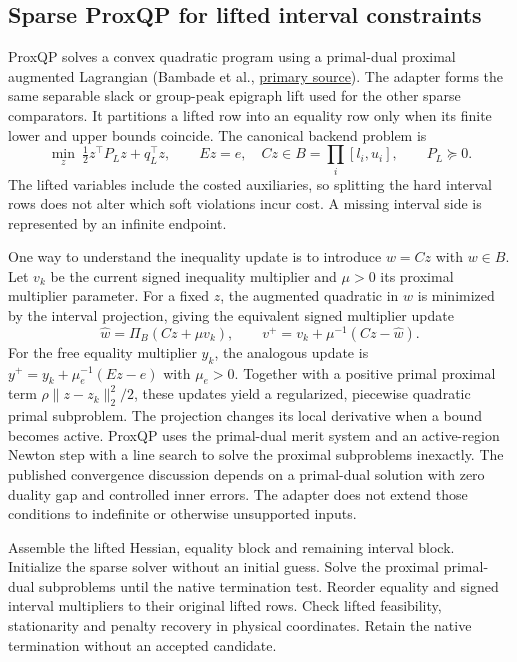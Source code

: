 \subsection{Sparse ProxQP for lifted interval constraints}\label{sec:method-proxqp}
ProxQP solves a convex quadratic program using a primal-dual proximal
augmented Lagrangian (Bambade et al., \href{https://simple-robotics.github.io/publications/proxqp/}{primary source}).
The adapter forms the same separable slack or group-peak epigraph lift
used for the other sparse comparators. It partitions a lifted row into
an equality row only when its finite lower and upper bounds coincide.
The canonical backend problem is
\begin{equation}\label{eq:proxqp-interval-form}
 \min_z \ \tfrac12z^\top P_Lz+q_L^\top z,\qquad
 Ez=e,\quad Cz\in B=\prod_i[l_i,u_i],
 \qquad P_L\succeq0.
\end{equation}
The lifted variables include the costed auxiliaries, so splitting the
hard interval rows does not alter which soft violations incur cost.
A missing interval side is represented by an infinite endpoint.

One way to understand the inequality update is to introduce \(w=Cz\)
with \(w\in B\). Let \(v_k\) be the current signed inequality multiplier
and \(\mu>0\) its proximal multiplier parameter. For a fixed \(z\), the
augmented quadratic in \(w\) is minimized by the interval projection,
giving the equivalent signed multiplier update
\begin{equation}\label{eq:proxqp-dual-update}
 \widehat w=\Pi_B(Cz+\mu v_k),\qquad
 v^+=v_k+\mu^{-1}(Cz-\widehat w).
\end{equation}
For the free equality multiplier \(y_k\), the analogous update is
\(y^+=y_k+\mu_e^{-1}(Ez-e)\) with \(\mu_e>0\).
Together with a positive primal proximal term
\(\rho\lVert z-z_k\rVert_2^2/2\), these updates yield a regularized,
piecewise quadratic primal subproblem. The projection changes its
local derivative when a bound becomes active. ProxQP uses the
primal-dual merit system and an active-region Newton step with a line
search to solve the proximal subproblems inexactly. The published
convergence discussion depends on a primal-dual solution with zero
duality gap and controlled inner errors. The adapter does not extend
those conditions to indefinite or otherwise unsupported inputs.

\begin{algorithm}[ht]
\caption{Sparse ProxQP and signed recovery}\label{alg:proxqp-route}
\begin{algorithmic}[1]
\State Assemble the lifted Hessian, equality block and remaining interval block.
\State Initialize the sparse solver without an initial guess.
\State Solve the proximal primal-dual subproblems until the native termination test.
 \State Reorder equality and signed interval multipliers to their original lifted rows.
 \State Check lifted feasibility, stationarity and penalty recovery in physical coordinates.
\Else
 \State Retain the native termination without an accepted candidate.
\EndIf
\end{algorithmic}
\end{algorithm}

